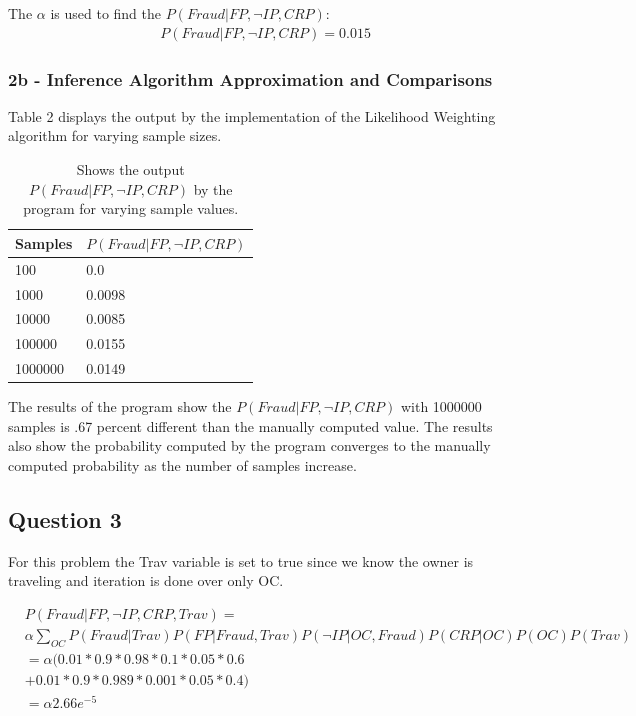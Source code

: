 \documentclass[a4paper,11pt]{report}
\begin{document}
		    The $\alpha$ is used to find the $P(Fraud|FP, \neg IP, CRP)$:
		    \begin{align*}
		   &P(Fraud|FP, \neg IP, CRP)= 0.015
		   \end{align*}
		   
		 \subsubsection{2b - Inference Algorithm Approximation and Comparisons}
		 	Table 2 displays the output by the implementation of the Likelihood Weighting algorithm for varying sample sizes. 
		         \begin {table}[h]
			\begin{tabular*}{0.42\textwidth}[left]{|l|l|}
			\hline
			  Samples & \multicolumn{1}{|c|}{$P(Fraud|FP, \neg IP, CRP)$} \\
			  \hline
			  100 & 0.0 \\
			  1000 & 0.0098 \\
			  10000 & 0.0085  \\
			  100000 & 0.0155 \\
			  1000000 & 0.0149 \\
			  \hline
			\end{tabular*}
			    \caption{Shows the output $P(Fraud|FP, \neg IP, CRP)$ by the program for varying sample values.}
			\end{table}
			
			The results of the program show the $P(Fraud|FP, \neg IP, CRP)$ with 1000000 samples is .67 percent different than the manually computed value. The results also show the probability computed by the program converges to the manually computed probability as the number of samples increase.

   \subsection{Question 3}
	For this problem the Trav variable is set to true since we know the owner is traveling and iteration is done over only OC.

	   \begin{align*}
	   &P(Fraud|FP, \neg IP, CRP, Trav) = \\
	   &\alpha \displaystyle\sum\limits_{OC} P(Fraud|Trav) P(FP|Fraud, Trav) P(\neg IP|OC, Fraud) P(CRP|OC) P(OC) P(Trav) \\
	   &=\alpha ( 0.01*0.9*0.98*0.1*0.05*0.6 \\
	      &+ 0.01*0.9*0.989*0.001*0.05*0.4) \\
	   &= \alpha 2.66e^{-5}
	   \end{align*}
	
\end{document}
